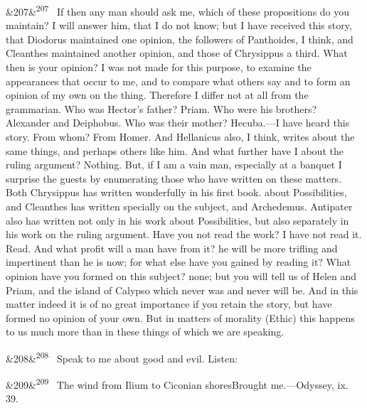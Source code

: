 \documentclass[12pt]{article}
\newcommand{\para}[1][]{\par\noindent\ifx&#1&\else\textsuperscript{\footnotesize #1}~\fi}
\begin{document}
\para[207] If then any man should ask me, which of these propositions do you maintain? I will answer him, that I do not know; but I have received this story, that Diodorus maintained one opinion, the followers of Panthoides, I think, and Cleanthes maintained another opinion, and those of Chrysippus a third. What then is your opinion? I was not made for this purpose, to examine the appearances that occur to me, and to compare what others say and to form an opinion of my own on the thing. Therefore I differ not at all from the grammarian. Who was Hector's father? Priam. Who were his brothers? Alexander and Deiphobus. Who was their mother? Hecuba.—I have heard this story. From whom? From Homer. And Hellanicus also, I think, writes about the same things, and perhaps others like him. And what further have I about the ruling argument? Nothing. But, if I am a vain man, especially at a banquet I surprise the guests by enumerating those who have written on these matters. Both Chrysippus has written wonderfully in his first book. about Possibilities, and Cleanthes has written specially on the subject, and Archedemus. Antipater also has written not only in his work about Possibilities, but also separately in his work on the ruling argument. Have you not read the work? I have not read it. Read. And what profit will a man have from it? he will be more trifling and impertinent than he is now; for what else have you gained by reading it? What opinion have you formed on this subject? none; but you will tell us of Helen and Priam, and the island of Calypso which never was and never will be. And in this matter indeed it is of no great importance if you retain the story, but have formed no opinion of your own. But in matters of morality (Ethic) this happens to us much more than in these things of which we are speaking.

\para[208] Speak to me about good and evil. Listen:

\para[209] The wind from Ilium to Ciconian shoresBrought me.—Odyssey, ix. 39.
\end{document}
